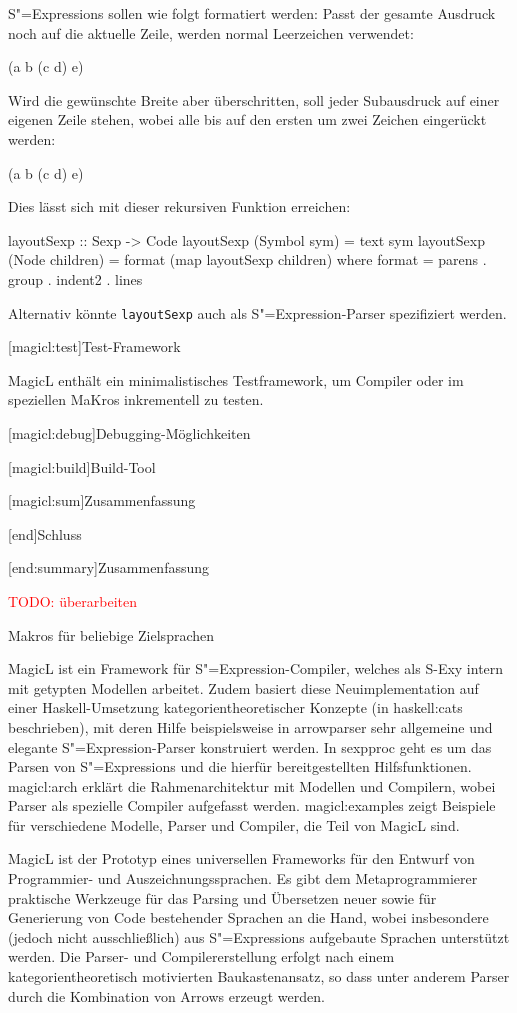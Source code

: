 \documentclass[11pt, a4paper, bibgerm]{book}
\newcommand\icode[1]{\lstinline?#1?}
\newcommand{\todo}[1]{
  \textcolor{red}{TODO: #1}
}
\newcommand\lchapter{}
\newcommand\lsection{}
\newcommand\sref{}
\newcommand{\sexy}{S-Exy}
\newcommand{\sexp}{S"=Expression}
\newcommand{\sexps}{S"=Expressions}
\begin{document}
\sexps{} sollen wie folgt formatiert werden: Passt der gesamte Ausdruck
noch auf die aktuelle Zeile, werden normal Leerzeichen verwendet:
\begin{code}
(a b (c d) e)
\end{code}
Wird die gewünschte Breite aber überschritten, soll jeder Subausdruck
auf einer eigenen Zeile stehen, wobei alle bis auf den ersten um zwei
Zeichen eingerückt werden:
\begin{code}
(a
  b
  (c d)
  e)
\end{code}
Dies lässt sich mit dieser rekursiven Funktion erreichen:
\begin{code}
layoutSexp :: Sexp -> Code
layoutSexp (Symbol sym)    = text sym
layoutSexp (Node children) = format (map layoutSexp children)
  where format = parens . group . indent2 . lines
\end{code} %
Alternativ könnte \icode{layoutSexp} auch als \sexp{}-Parser
spezifiziert werden.

\lsection[magicl:test]{Test-Framework}

MagicL enthält ein minimalistisches Testframework, um Compiler
oder im speziellen MaKros inkrementell zu testen.

\lsection[magicl:debug]{Debugging-Möglichkeiten}

\lsection[magicl:build]{Build-Tool}

\lsection[magicl:sum]{Zusammenfassung}

\lchapter[end]{Schluss}

\lsection[end:summary]{Zusammenfassung}

\todo{überarbeiten}

Makros für beliebige Zielsprachen

MagicL ist ein Framework für \sexp-Compiler, welches 
als \sexy{} intern mit getypten Modellen arbeitet. Zudem basiert diese
Neuimplementation auf einer Haskell-Umsetzung kategorientheoretischer
Konzepte (in \sref{haskell:cats} beschrieben), mit deren Hilfe
beispielsweise in \sref{arrowparser} sehr allgemeine und elegante
\sexp{}-Parser konstruiert werden. In \sref{sexpproc} geht es um
das Parsen von \sexps{} und die hierfür bereitgestellten
Hilfsfunktionen. \sref{magicl:arch} erklärt die Rahmenarchitektur mit
Modellen und Compilern, wobei Parser als spezielle Compiler aufgefasst
werden. \sref{magicl:examples} zeigt Beispiele für verschiedene
Modelle, Parser und Compiler, die Teil von MagicL sind.


MagicL ist der Prototyp eines
universellen Frameworks für den Entwurf von Programmier- und
Auszeichnungssprachen. Es gibt dem Metaprogrammierer praktische
Werkzeuge für das Parsing und Übersetzen neuer sowie für Generierung von
Code bestehender Sprachen an die Hand, wobei insbesondere (jedoch
nicht ausschließlich) aus \sexps{} aufgebaute Sprachen unterstützt
werden. Die Parser- und Compilererstellung erfolgt nach einem
kategorientheoretisch motivierten Baukastenansatz, so dass
unter anderem Parser durch die Kombination von Arrows erzeugt werden.
\end{document}
